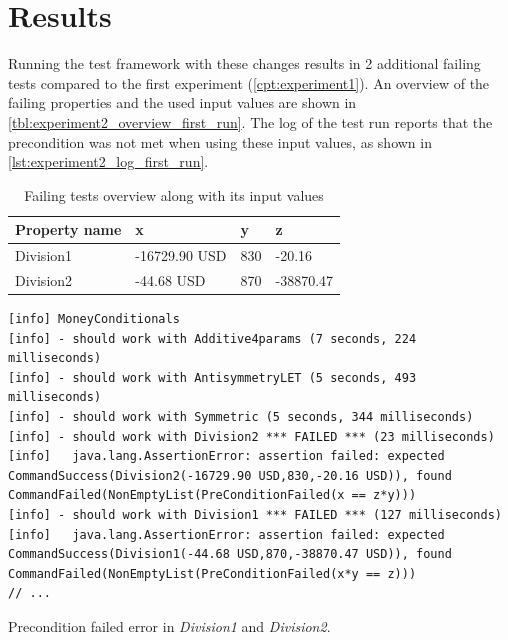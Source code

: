 \section{Results}
Running the test framework with these changes results in 2 additional failing tests
compared to the first experiment (\autoref{cpt:experiment1}). An overview of the
failing properties and the used input values are shown in
\autoref{tbl:experiment2_overview_first_run}. The log of the test run reports
that the precondition was not met when using these input values, as shown in
\autoref{lst:experiment2_log_first_run}.
\FloatBarrier
\begin{table}[!ht]
\centering
\begin{tabular}{llll}
\hline
\textbf{Property name} & \textbf{x}    & \textbf{y} & \textbf{z} \\ \hline
Division1              & -16729.90 USD & 830        & -20.16     \\
Division2              & -44.68 USD    & 870        & -38870.47  \\ \hline
\end{tabular}
\caption{Failing tests overview along with its input values}
\label{tbl:experiment2_overview_first_run}
\end{table}
\FloatBarrier

\FloatBarrier
\begin{sourcecode}[!ht]
\begin{lstlisting}[language=Log]
[info] MoneyConditionals
[info] - should work with Additive4params (7 seconds, 224 milliseconds)
[info] - should work with AntisymmetryLET (5 seconds, 493 milliseconds)
[info] - should work with Symmetric (5 seconds, 344 milliseconds)
[info] - should work with Division2 *** FAILED *** (23 milliseconds)
[info]   java.lang.AssertionError: assertion failed: expected CommandSuccess(Division2(-16729.90 USD,830,-20.16 USD)), found CommandFailed(NonEmptyList(PreConditionFailed(x == z*y)))
[info] - should work with Division1 *** FAILED *** (127 milliseconds)
[info]   java.lang.AssertionError: assertion failed: expected CommandSuccess(Division1(-44.68 USD,870,-38870.47 USD)), found CommandFailed(NonEmptyList(PreConditionFailed(x*y == z)))
// ...
\end{lstlisting}
\caption{Precondition failed error in \textit{Division1} and \textit{Division2}.}
\label{lst:experiment2_log_first_run}
\end{sourcecode}
\FloatBarrier

